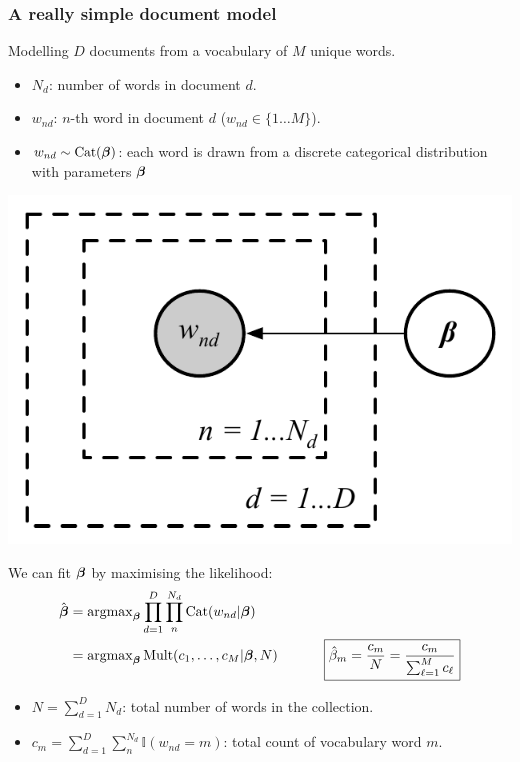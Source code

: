 \begin{frame}
\frametitle{A really simple document model}

Modelling $D$ documents from a vocabulary of $M$ unique words.

\parbox{0.7\linewidth}{
\begin{itemize}
\item $N_d$: number of words in document $d$.
\item $w_{nd}$: $n$-th word in document $d$ ($w_{nd}\in\{1 \ldots M\}$).
\item $w_{nd} \sim \rm{Cat}(\boldsymbol{\beta})$: each word is drawn from a
  discrete categorical distribution with parameters $\boldsymbol{\beta}$
\end{itemize}
}
%
\parbox{0.29\linewidth}{
\hfill
\includegraphics[width=\linewidth]{categorical_model}
}
%
We can fit $\boldsymbol{\beta}$ by maximising the likelihood:
%
\begin{align*}
\hat{\boldsymbol{\beta}} &= \operatorname{argmax}_{\boldsymbol{\beta}} \prod_{d=1}^D \prod_n^{N_d}
\mathrm{Cat}(w_{nd} |\boldsymbol{\beta})\\
&= \operatorname{argmax}_{\boldsymbol{\beta}} \mathrm{Mult}(c_1,\ldots,c_M|\boldsymbol{\beta},N)
{\; \; \; \; \; \; \; \; \; \; \; \; }
\boxed{\hat\beta_m =  \frac{c_m}{N} = \frac{c_m}{\sum_{\ell=1}^M c_\ell}}
\end{align*}
%
\vspace{-2mm}
\begin{itemize}
\item $N=\sum_{d=1}^D N_d$: total number of words in the collection.
\item $c_{m}=\sum_{d=1}^D \sum_n^{N_d} \mathbb{I}(w_{nd} = m)$: total count of vocabulary  word $m$.
\end{itemize}

\end{frame}


